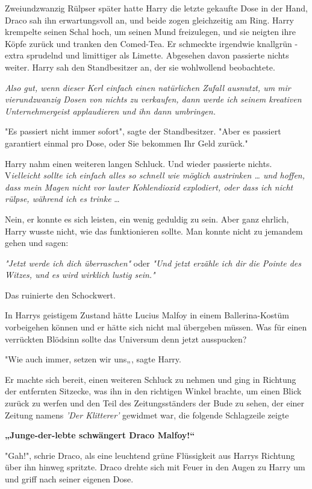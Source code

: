 {Zweiundzwanzig Rülpser später hatte Harry die letzte gekaufte Dose in der Hand, Draco sah ihn erwartungsvoll an, und beide zogen gleichzeitig am Ring. Harry krempelte seinen Schal hoch, um seinen Mund freizulegen, und sie neigten ihre Köpfe zurück und tranken den Comed-Tea. Er schmeckte irgendwie knallgrün - extra sprudelnd und limittiger als Limette. Abgesehen davon passierte nichts weiter. Harry sah den Standbesitzer an, der sie wohlwollend beobachtete.

\emph{Also gut, wenn dieser Kerl einfach einen natürlichen Zufall ausnutzt, um mir vierundzwanzig Dosen von nichts zu verkaufen, dann werde ich seinem kreativen Unternehmergeist applaudieren und ihn dann umbringen.}

"Es passiert nicht immer sofort", sagte der Standbesitzer. "Aber es passiert garantiert einmal pro Dose, oder Sie bekommen Ihr Geld zurück."

Harry nahm einen weiteren langen Schluck. Und wieder passierte nichts. V\emph{ielleicht sollte ich einfach alles so schnell wie möglich austrinken … und hoffen, dass mein Magen nicht vor lauter Kohlendioxid explodiert, oder dass ich nicht rülpse, während ich es trinke} …

Nein, er konnte es sich leisten, ein wenig geduldig zu sein. Aber ganz ehrlich, Harry wusste nicht, wie das funktionieren sollte. Man konnte nicht zu jemandem gehen und sagen:

\emph{"Jetzt werde ich dich überraschen"} oder \emph{"Und jetzt erzähle ich dir die Pointe des Witzes, und es wird wirklich lustig sein."}

Das ruinierte den Schockwert.

In Harrys geistigem Zustand hätte Lucius Malfoy in einem Ballerina-Kostüm vorbeigehen können und er hätte sich nicht mal übergeben müssen. Was für einen verrückten Blödsinn sollte das Universum denn jetzt ausspucken?

"Wie auch immer, setzen wir uns„, sagte Harry.

Er machte sich bereit, einen weiteren Schluck zu nehmen und ging in Richtung der entfernten Sitzecke, was ihn in den richtigen Winkel brachte, um einen Blick zurück zu werfen und den Teil des Zeitungsständers der Bude zu sehen, der einer Zeitung namens \emph{'Der Klitterer'} gewidmet war, die folgende Schlagzeile zeigte

\textbf{„Junge-der-lebte schwängert Draco Malfoy!“}

"Gah!", schrie Draco, als eine leuchtend grüne Flüssigkeit aus Harrys Richtung über ihn hinweg spritzte. Draco drehte sich mit Feuer in den Augen zu Harry um und griff nach seiner eigenen Dose.

}
